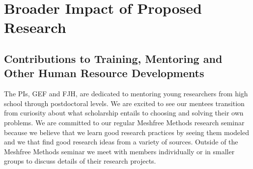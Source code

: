 \documentclass[11pt]{NSFamsart}
\begin{document}


\section{Broader Impact of Proposed Research}\label{SectBroad}


\subsection{Contributions to Training, Mentoring and Other Human Resource Developments}

The PIs, GEF and FJH, are dedicated to mentoring young researchers from high school through postdoctoral levels.  We are excited to see our mentees transition from curiosity about what scholarship entails to choosing and solving their own problems.  We are committed to our regular Meshfree Methods research seminar because we believe that we learn good research practices by seeing them modeled and we that find good research ideas from a variety of sources. Outside of the Meshfree Methods seminar we meet with members individually or in smaller groups to discuss details of their research projects.
\end{document}
